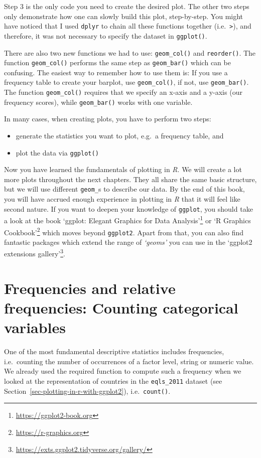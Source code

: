 \documentclass[
  letterpaper,
]{krantz}
\renewcommand{\href}[2]{#2\footnote{\url{#1}}}
\begin{document}
Step 3 is the only code you need to create the desired plot. The other
two steps only demonstrate how one can slowly build this plot,
step-by-step. You might have noticed that I used \texttt{dplyr} to chain
all these functions together (i.e.~\texttt{\textbar{}\textgreater{}}),
and therefore, it was not necessary to specify the dataset in
\texttt{ggplot()}.

There are also two new functions we had to use: \texttt{geom\_col()} and
\texttt{reorder()}. The function \texttt{geom\_col()} performs the same
step as \texttt{geom\_bar()} which can be confusing. The easiest way to
remember how to use them is: If you use a frequency table to create your
barplot, use \texttt{geom\_col()}, if not, use \texttt{geom\_bar()}. The
function \texttt{geom\_col()} requires that we specify an x-axis and a
y-axis (our frequency scores), while \texttt{geom\_bar()} works with one
variable.

In many cases, when creating plots, you have to perform two steps:

\begin{itemize}
\item
  generate the statistics you want to plot, e.g.~a frequency table, and
\item
  plot the data via \texttt{ggplot()}
\end{itemize}

Now you have learned the fundamentals of plotting in \emph{R}. We will
create a lot more plots throughout the next chapters. They all share the
same basic structure, but we will use different \texttt{geom\_}s to
describe our data. By the end of this book, you will have accrued enough
experience in plotting in \emph{R} that it will feel like second nature.
If you want to deepen your knowledge of \texttt{ggplot}, you should take
a look at the book \href{https://ggplot2-book.org}{`ggplot: Elegant
Graphics for Data Analysis'} or \href{https://r-graphics.org}{`R
Graphics Cookbook'} which moves beyond \texttt{ggplot2}. Apart from
that, you can also find fantastic packages which extend the range of
\emph{`geoms'} you can use in the
\href{https://exts.ggplot2.tidyverse.org/gallery/}{`ggplot2 extensions
gallery'}.

\section{Frequencies and relative frequencies: Counting categorical
variables}\label{sec-frequency}

One of the most fundamental descriptive statistics includes frequencies,
i.e.~counting the number of occurrences of a factor level, string or
numeric value. We already used the required function to compute such a
frequency when we looked at the representation of countries in the
\texttt{eqls\_2011} dataset (see
Section~\ref{sec-plotting-in-r-with-ggplot2}), i.e.~\texttt{count()}.
\end{document}
